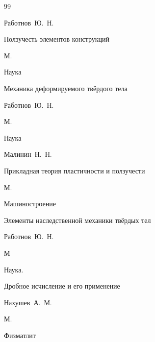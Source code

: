 \begin{thebibliography}{99}




\by Работнов~Ю.~Н.

\book Ползучесть элементов конструкций

\publaddr М.

\publ Наука








\book Механика деформируемого твёрдого тела

\by Работнов~Ю.~Н.

\publaddr М.

\publ Наука







\by Малинин~Н.~Н.

\book Прикладная теория пластичности и ползучести

\publaddr М.

\publ Машиностроение






\book Элементы наследственной механики твёрдых тел

\by Работнов~Ю.~Н.

\publaddr М

\publ Наука. 






\book Дробное исчисление и его применение

\by Нахушев~А.~М.

\publaddr М.

\publ Физматлит




\end{thebibliography}
